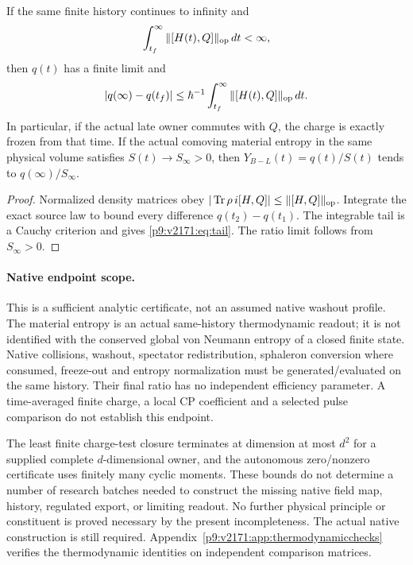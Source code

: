 \documentclass[12pt,a4paper]{article}
\begin{document}
\begin{proposition}\label{p9:v2171:prop:tail}
If the same finite history continues to infinity and
\[
 \int_{t_f}^{\infty}\|[H(t),Q]\|_{\rm op}\,dt<\infty,
\]
then $q(t)$ has a finite limit and
\begin{equation}\label{p9:v2171:eq:tail}
 |q(\infty)-q(t_f)|\leq\hbar^{-1}
  \int_{t_f}^{\infty}\|[H(t),Q]\|_{\rm op}\,dt.
\end{equation}
In particular, if the actual late owner commutes with $Q$, the charge is
exactly frozen from that time. If the actual comoving material entropy in
the same physical volume satisfies $S(t)\to S_\infty>0$, then
$Y_{B-L}(t)=q(t)/S(t)$ tends to $q(\infty)/S_\infty$.
\end{proposition}
\begin{proof}
Normalized density matrices obey
$|\operatorname{Tr}\rho\,i[H,Q]|\leq\|[H,Q]\|_{\rm op}$. Integrate the exact source
law to bound every difference $q(t_2)-q(t_1)$. The integrable tail is a
Cauchy criterion and gives \eqref{p9:v2171:eq:tail}. The ratio limit follows from
$S_\infty>0$.
\end{proof}

\paragraph{Native endpoint scope.}
This is a sufficient analytic certificate, not an assumed native washout
profile. The material entropy is an actual same-history thermodynamic
readout; it is not identified with the conserved global von Neumann entropy
of a closed finite state. Native collisions, washout, spectator redistribution,
sphaleron conversion where consumed, freeze-out and entropy normalization
must be generated/evaluated on the same history. Their final ratio has no
independent efficiency parameter. A time-averaged finite charge, a local CP
coefficient and a selected pulse comparison do not establish this endpoint.


The least finite charge-test closure terminates at dimension at most
$d^2$ for a supplied complete $d$-dimensional owner, and the autonomous
zero/nonzero certificate uses finitely many cyclic moments. These bounds
do not determine a number of research batches needed to construct the
missing native field map, history, regulated export, or limiting readout.
No further physical principle or constituent is proved necessary by the
present incompleteness. The actual native construction is still required.
Appendix~\ref{p9:v2171:app:thermodynamicchecks} verifies the thermodynamic
identities on independent comparison matrices.
\end{document}
